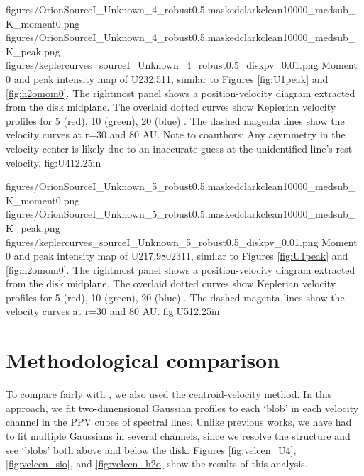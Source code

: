 \documentclass[twocolumn]{aastex61}
\begin{document}
\FigureThree
{{figures/OrionSourceI_Unknown_4_robust0.5.maskedclarkclean10000_medsub_K_moment0}.png}
{{figures/OrionSourceI_Unknown_4_robust0.5.maskedclarkclean10000_medsub_K_peak}.png}
{{figures/keplercurves_sourceI_Unknown_4_robust0.5_diskpv_0.01}.png}
{Moment 0 and peak intensity map of U232.511, similar to Figures \ref{fig:U1peak} and \ref{fig:h2omom0}.
The rightmost panel shows a position-velocity diagram extracted from the disk midplane.
The overlaid dotted curves show Keplerian velocity profiles for 5 (red), 10 (green), 20 (blue) \msun.
The dashed magenta lines show the velocity curves at r=30 and 80 AU.
{\color{red} Note to coauthors: Any asymmetry in the velocity center is likely due to an inaccurate
guess at the unidentified line's rest velocity.}
}
{fig:U4}{1}{2.25in}

\FigureThree
{{figures/OrionSourceI_Unknown_5_robust0.5.maskedclarkclean10000_medsub_K_moment0}.png}
{{figures/OrionSourceI_Unknown_5_robust0.5.maskedclarkclean10000_medsub_K_peak}.png}
{{figures/keplercurves_sourceI_Unknown_5_robust0.5_diskpv_0.01}.png}
{Moment 0 and peak intensity map of U217.9802311, similar to Figures \ref{fig:U1peak} and \ref{fig:h2omom0}.
The rightmost panel shows a position-velocity diagram extracted from the disk midplane.
The overlaid dotted curves show Keplerian velocity profiles for 5 (red), 10 (green), 20 (blue) \msun.
The dashed magenta lines show the velocity curves at r=30 and 80 AU.
}
{fig:U5}{1}{2.25in}

\section{Methodological comparison}
\label{appendix:centroids}
To compare fairly with \citet{Plambeck2016a}, we also used the
centroid-velocity method.  In this approach, we fit two-dimensional Gaussian
profiles to each `blob' in each velocity channel in the PPV cubes of spectral
lines.  Unlike previous works, we have had to fit multiple Gaussians in several
channels, since we resolve the structure and see `blobs' both above and below
the disk.
Figures \ref{fig:velcen_U4}, \ref{fig:velcen_sio}, and \ref{fig:velcen_h2o}
show the results of this analysis.

\end{document}
